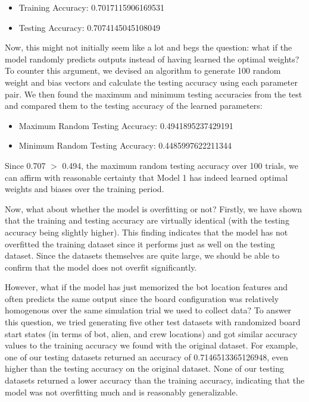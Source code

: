 \documentclass[11pt]{article}
\begin{document}
\begin{itemize}
    \item Training Accuracy: 0.7017115906169531
    \item Testing Accuracy: 0.7074145045108049
\end{itemize}

Now, this might not initially seem like a lot and begs the question: what if the model randomly predicts outputs instead of having learned the optimal weights? To counter this argument, we devised an algorithm to generate 100 random weight and bias vectors and calculate the testing accuracy using each parameter pair. We then found the maximum and minimum testing accuracies from the test and compared them to the testing accuracy of the learned parameters:

\begin{itemize}
    \item Maximum Random Testing Accuracy: 0.4941895237429191
    \item Minimum Random Testing Accuracy: 0.4485997622211344
\end{itemize}

Since 0.707 $>$ 0.494, the maximum random testing accuracy over 100 trials, we can affirm with reasonable certainty that Model 1 has indeed learned optimal weights and biases over the training period.

Now, what about whether the model is overfitting or not? Firstly, we have shown that the training and testing accuracy are virtually identical (with the testing accuracy being slightly higher). This finding indicates that the model has not overfitted the training dataset since it performs just as well on the testing dataset. Since the datasets themselves are quite large, we should be able to confirm that the model does not overfit significantly.

However, what if the model has just memorized the bot location features and often predicts the same output since the board configuration was relatively homogenous over the same simulation trial we used to collect data? To answer this question, we tried generating five other test datasets with randomized board start states (in terms of bot, alien, and crew locations) and got similar accuracy values to the training accuracy we found with the original dataset. For example, one of our testing datasets returned an accuracy of 0.7146513365126948, even higher than the testing accuracy on the original dataset. None of our testing datasets returned a lower accuracy than the training accuracy, indicating that the model was not overfitting much and is reasonably generalizable. \newline
\end{document}
